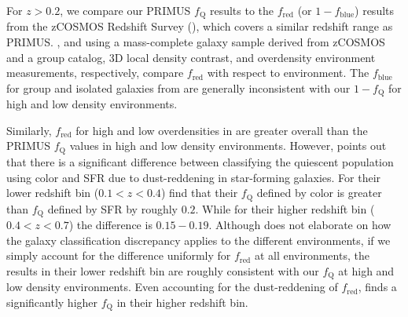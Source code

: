 
For $z > 0.2$, we compare our PRIMUS $f_{\mathrm{Q}}$ results to the $f_{\mathrm{red}}$ (or $1-f_{\mathrm{blue}}$) results from the zCOSMOS Redshift Survey (\citealt{Iovino:2010aa, Kovac:2014aa}), which covers a similar redshift range as PRIMUS. \cite{Iovino:2010aa}, and \cite{Kovac:2014aa} using a mass-complete galaxy sample derived from zCOSMOS and a group catalog, 3D local density contrast, and overdensity environment measurements, respectively, compare $f_{\mathrm{red}}$ with respect to environment. The $f_{\mathrm{blue}}$ for group and isolated galaxies from \cite{Iovino:2010aa} are generally inconsistent with our $1-f_{\mathrm{Q}}$ for high and low density environments. 

Similarly, $f_{\mathrm{red}}$ for high and low overdensities in
\cite{Kovac:2014aa} are  greater overall than the PRIMUS $f_{\mathrm{Q}}$
values in high and low density environments. However,
\cite{Kovac:2014aa} points out that there is a significant difference
between classifying the quiescent population using color and SFR due to dust-reddening in star-forming galaxies. For their lower redshift bin ($0.1 < z < 0.4$) \cite{Kovac:2014aa} find that their $f_{\mathrm{Q}}$ defined by color is greater than $f_{\mathrm{Q}}$ defined by SFR by roughly $0.2$. While for their higher redshift bin ($0.4 < z < 0.7$) the difference is $0.15-0.19$. Although \cite{Kovac:2014aa} does not elaborate on how the galaxy classification discrepancy applies to the different environments, if we simply account for the difference uniformly for $f_{\mathrm{red}}$ at all environments, the \cite{Kovac:2014aa} results in their lower redshift bin are roughly consistent with our $f_{\mathrm{Q}}$ at high and low density environments. Even accounting for the dust-reddening of $f_{\mathrm{red}}$, \cite{Kovac:2014aa} finds a significantly higher $f_{\mathrm{Q}}$ in their higher redshift bin. 

